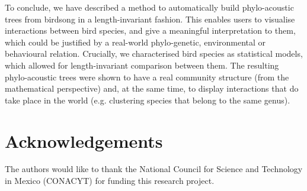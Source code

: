\documentclass[pdftex,11pt,a4paper]{article}
\theoremstyle{definition}
\theoremstyle{remark}
\begin{document}
\par To conclude, we have described a method to automatically build phylo-acoustic trees from birdsong in a length-invariant fashion. This enables users to visualise interactions between bird species, and give a meaningful interpretation to them, which could be justified by a real-world phylo-genetic, environmental or behavioural relation. Crucially, we characterised bird species as statistical models, which allowed for length-invariant comparison between them. The resulting phylo-acoustic trees were shown to have a real community structure (from the mathematical perspective) and, at the same time, to display interactions that do take place in the world (e.g. clustering species that belong to the same genus).

\section*{Acknowledgements}
The authors would like to thank the National Council for Science and Technology in Mexico (CONACYT) for funding this research project. 




\end{document}
